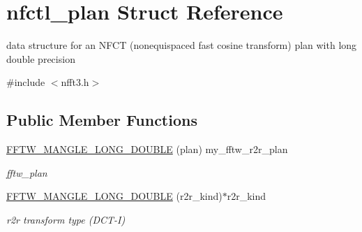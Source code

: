 \hypertarget{structnfctl__plan}{\section{nfctl\-\_\-plan Struct Reference}
\label{structnfctl__plan}
}


data structure for an N\-F\-C\-T (nonequispaced fast cosine transform) plan with long double precision  




{\ttfamily \#include $<$nfft3.\-h$>$}

\subsection*{Public Member Functions}
\begin{DoxyCompactItemize}
\item 
\hypertarget{structnfctl__plan_a59134c76d93ffd73a6fc738babf5d443}{\hyperlink{structnfctl__plan_a59134c76d93ffd73a6fc738babf5d443}{F\-F\-T\-W\-\_\-\-M\-A\-N\-G\-L\-E\-\_\-\-L\-O\-N\-G\-\_\-\-D\-O\-U\-B\-L\-E} (plan) my\-\_\-fftw\-\_\-r2r\-\_\-plan}\label{structnfctl__plan_a59134c76d93ffd73a6fc738babf5d443}

\begin{DoxyCompactList}\small\item\em fftw\-\_\-plan \end{DoxyCompactList}\item 
\hypertarget{structnfctl__plan_ad0a55579cc5f04b0af4cc28abd445083}{\hyperlink{structnfctl__plan_ad0a55579cc5f04b0af4cc28abd445083}{F\-F\-T\-W\-\_\-\-M\-A\-N\-G\-L\-E\-\_\-\-L\-O\-N\-G\-\_\-\-D\-O\-U\-B\-L\-E} (r2r\-\_\-kind)$\ast$r2r\-\_\-kind}\label{structnfctl__plan_ad0a55579cc5f04b0af4cc28abd445083}

\begin{DoxyCompactList}\small\item\em r2r transform type (D\-C\-T-\/\-I) \end{DoxyCompactList}\end{DoxyCompactItemize}
